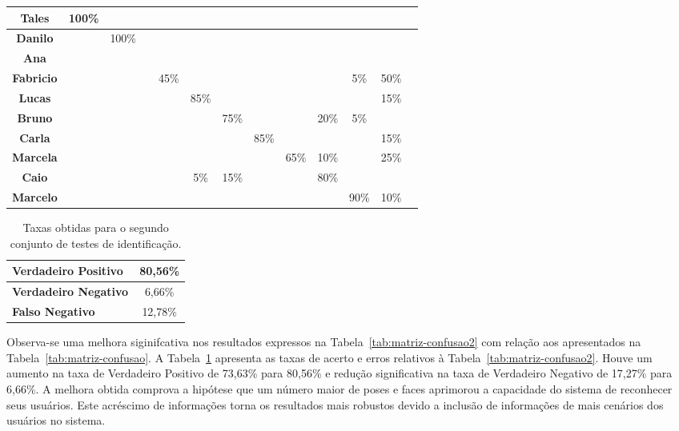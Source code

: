\begin{table}[htb]
\begin{center}
\begin{tabular}{|c|c|c|c|c|c|c|c|c|c|c|c|c|}
				\hline \bf Tales 			&100\% & 			& 		 & 			&   	 & 			& 		& 		&	 		& 		& 		\\
				\hline \bf Danilo 		& 		 &100\%	& 		 & 			&   	 & 			& 		& 		& 		& 		& 		 		\\
				\hline \bf Ana 				& 		 & 			& 		 & 			&   	 & 			& 		& 		& 		& 		& 		    \\
				\hline \bf Fabricio 	& 		 & 			& 		 &45\%	&      & 			& 		& 		& 		& 5\%	& 50\%    		\\
				\hline \bf Lucas 			& 		 & 			& 		 & 			& 85\% & 			& 		& 		& 		& 		& 15\%		\\
				\hline \bf Bruno 			& 		 & 			& 		 & 			& 		 & 75\% & 	  & 		&20\% & 5\%	& 		  	\\
				\hline \bf Carla 			& 		 & 			& 		 & 			& 		 & 			&85\% &		  & 	  & 		& 15\%		  	\\
				\hline \bf Marcela 		& 		 & 			& 		 & 			& 		 &      & 		&65\% &10\% & 		& 25\%		  	\\
				\hline \bf Caio 		  & 		 & 			& 		 & 			& 	5\%& 	15\%& 		& 		&80\%	&	 		& 		  	\\
				\hline \bf Marcelo 		& 		 & 			& 		 & 			& 		 & 			& 		& 		& 		& 90\%& 10\%		  	\\
				\hline
			\end{tabular}
		\end{center}
	\end{table}

	\begin{table}[htb]
		\begin{center}
			\caption{Taxas obtidas para o segundo conjunto de testes de identificação.}
			\label{tab:taxas2}
			\begin{tabular}{|l|c|}
				\hline \bf Verdadeiro Positivo & 80,56\% \\
				\hline \bf Verdadeiro Negativo & 6,66\% \\
				\hline \bf Falso Negativo & 12,78\% \\
				\hline
			\end{tabular}
		\end{center}
	\end{table}


	Observa-se uma melhora siginifcativa nos resultados expressos na Tabela~\ref{tab:matriz-confusao2} com relação aos apresentados na Tabela~\ref{tab:matriz-confusao}. A Tabela~\ref{tab:taxas2} apresenta as taxas de acerto e erros relativos à Tabela~\ref{tab:matriz-confusao2}. Houve um aumento na taxa de Verdadeiro Positivo de 73,63\% para 80,56\% e redução significativa na taxa de Verdadeiro Negativo de 17,27\% para 6,66\%. A melhora obtida comprova a hipótese que um número maior de poses e faces aprimorou a capacidade do sistema de reconhecer seus usuários. Este acréscimo de informações torna os resultados mais robustos devido a inclusão de informações de mais cenários dos usuários no sistema.


